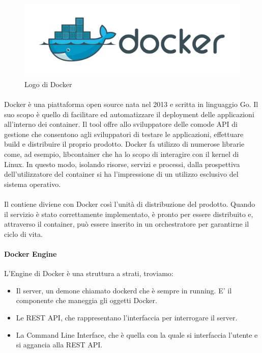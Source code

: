 \begin{figure}[h!]
	\centering
	\includegraphics[width=\textwidth,keepaspectratio=true]{capitoli/imgs/docker.png}
	\caption{Logo di Docker}
\end{figure}

\paragraph{}
Docker è una piattaforma open source nata nel 2013 e scritta in linguaggio Go. Il suo scopo è quello di facilitare ed automatizzare il deployment delle applicazioni all'interno dei container. Il tool offre allo sviluppatore delle comode API di gestione che consentono agli sviluppatori di testare le applicazioni, effettuare build e distribuire il proprio prodotto. Docker fa utilizzo di numerose librarie come, ad esempio, libcontainer che ha lo scopo di interagire con il kernel di Linux.  In questo modo, isolando risorse, servizi e processi, dalla prospettiva dell'utilizzatore del container si ha l'impressione di un utilizzo esclusivo del sistema operativo.

\paragraph{}
Il contiene diviene con Docker così l'unità di distribuzione del prodotto. Quando il servizio è stato correttamente implementato, è pronto per essere distribuito e, attraverso il container, può essere inserito in un orchestratore per garantirne il ciclo di vita.

\paragraph{Docker Engine}
L'Engine di Docker è una struttura a strati, troviamo:
\begin{itemize}
	\item Il server, un demone chiamato dockerd che è sempre in running. E' il componente che maneggia gli oggetti Docker.
	\item Le REST API, che rappresentano l'interfaccia per interrogare il server.
	\item La Command Line Interface, che è quella con la quale si interfaccia l'utente e si aggancia alla REST API.
\end{itemize}

